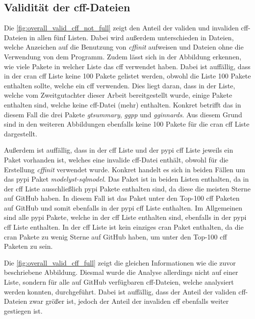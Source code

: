 \subsection*{Validität der \gls{cff}-Dateien}
Die \autoref{fig:overall_valid_cff_not_full} zeigt den Anteil der validen und invaliden \gls{cff}-Dateien in allen fünf Listen.
Dabei wird außerdem unterschieden in Dateien, welche Anzeichen auf die Benutzung von \emph{cffinit} aufweisen und Dateien ohne die Verwendung von dem Programm.
Zudem lässt sich in der Abbildung erkennen, wie viele Pakete in welcher Liste das \gls{cff} verwendet haben.
Dabei ist auffällig, dass in der \gls{cran} \gls{cff} Liste keine 100 Pakete gelistet werden, obwohl die Liste 100 Pakete enthalten sollte, welche ein \gls{cff} verwenden.
Dies liegt daran, dass in der Liste, welche vom Zweitgutachter dieser Arbeit bereitgestellt wurde, einige Pakete enthalten sind, welche keine \gls{cff}-Datei (mehr) enthalten.
Konkret betrifft das in diesem Fall die drei Pakete \emph{gtsummary}, \emph{ggpp} und \emph{gginnards}.
Aus diesem Grund sind in den weiteren Abbildungen ebenfalls keine 100 Pakete für die \gls{cran} \gls{cff} Liste dargestellt.

Außerdem ist auffällig, dass in der \gls{cff} Liste und der \gls{pypi} \gls{cff} Liste jeweils ein Paket vorhanden ist, welches eine invalide \gls{cff}-Datei enthält, obwohl für die Erstellung \emph{cffinit} verwendet wurde.
Konkret handelt es sich in beiden Fällen um das \gls{pypi} Paket \emph{modelyst-sqlmodel}.
Das Paket ist in beiden Listen enthalten, da in der \gls{cff} Liste ausschließlich \gls{pypi} Pakete enthalten sind, da diese die meisten Sterne auf GitHub haben.
In diesem Fall ist das Paket unter den Top-100 \gls{cff} Paketen auf GitHub und somit ebenfalls in der \gls{pypi} \gls{cff} Liste enthalten.
Im Allgemeinen sind alle \gls{pypi} Pakete, welche in der \gls{cff} Liste enthalten sind, ebenfalls in der \gls{pypi} \gls{cff} Liste enthalten.
In der \gls{cff} Liste ist kein einziges \gls{cran} Paket enthalten, da die \gls{cran} Pakete zu wenig Sterne auf GitHub haben, um unter den Top-100 \gls{cff} Paketen zu sein.

Die \autoref{fig:overall_valid_cff_full} zeigt die gleichen Informationen wie die zuvor beschriebene Abbildung.
Diesmal wurde die Analyse allerdings nicht auf einer Liste, sondern für alle auf GitHub verfügbaren \gls{cff}-Dateien, welche analysiert werden konnten, durchgeführt.
Dabei ist auffällig, dass der Anteil der validen \gls{cff}-Dateien zwar größer ist, jedoch der Anteil der invaliden \gls{cff} ebenfalls weiter gestiegen ist.

